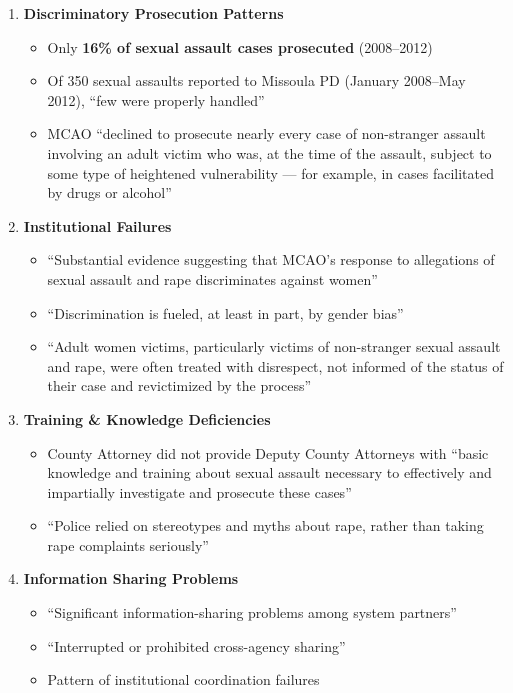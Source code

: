 \documentclass[11pt,letterpaper]{article}
\begin{document}
\begin{enumerate}[leftmargin=*]
\item \textbf{Discriminatory Prosecution Patterns}
\begin{itemize}
\item Only \textbf{16\% of sexual assault cases prosecuted} (2008--2012)
\item Of 350 sexual assaults reported to Missoula PD (January 2008--May 2012), ``few were properly handled''
\item MCAO ``declined to prosecute nearly every case of non-stranger assault involving an adult victim who was, at the time of the assault, subject to some type of heightened vulnerability --- for example, in cases facilitated by drugs or alcohol''
\end{itemize}

\item \textbf{Institutional Failures}
\begin{itemize}
\item ``Substantial evidence suggesting that MCAO's response to allegations of sexual assault and rape discriminates against women''
\item ``Discrimination is fueled, at least in part, by gender bias''
\item ``Adult women victims, particularly victims of non-stranger sexual assault and rape, were often treated with disrespect, not informed of the status of their case and revictimized by the process''
\end{itemize}

\item \textbf{Training \& Knowledge Deficiencies}
\begin{itemize}
\item County Attorney did not provide Deputy County Attorneys with ``basic knowledge and training about sexual assault necessary to effectively and impartially investigate and prosecute these cases''
\item ``Police relied on stereotypes and myths about rape, rather than taking rape complaints seriously''
\end{itemize}

\item \textbf{Information Sharing Problems}
\begin{itemize}
\item ``Significant information-sharing problems among system partners''
\item ``Interrupted or prohibited cross-agency sharing''
\item Pattern of institutional coordination failures
\end{itemize}
\end{enumerate}
\end{document}
